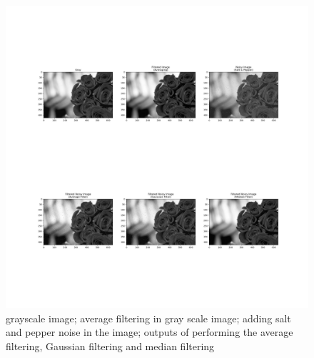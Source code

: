 \documentclass{article}
\begin{document}
{{        \begin{figure}[htp]
            \centering
            \includegraphics[width=1.0\textwidth]{Assignment-6/noise.jpg}
            \caption{grayscale image; average filtering in gray scale image; adding salt and pepper noise in the image; outputs of performing the average filtering, Gaussian filtering and median filtering}
        \end{figure}
    }
}
\clearpage
\end{document}
